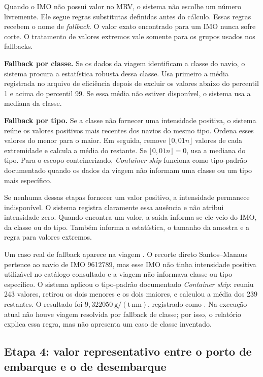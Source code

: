Quando o IMO não possui valor no MRV, o sistema não escolhe um número livremente. Ele segue regras substitutas definidas antes do cálculo. Essas regras recebem o nome de \emph{fallback}. O valor exato encontrado para um IMO nunca sofre corte. O tratamento de valores extremos vale somente para os grupos usados nos fallbacks.

\textbf{Fallback por classe.} Se os dados da viagem identificam a classe do navio, o sistema procura a estatística robusta dessa classe. Usa primeiro a média registrada no arquivo de eficiência depois de excluir os valores abaixo do percentil 1 e acima do percentil 99. Se essa média não estiver disponível, o sistema usa a mediana da classe.

\textbf{Fallback por tipo.} Se a classe não fornecer uma intensidade positiva, o sistema reúne os valores positivos mais recentes dos navios do mesmo tipo. Ordena esses valores do menor para o maior. Em seguida, remove \(\lfloor0{,}01n\rfloor\) valores de cada extremidade e calcula a média do restante. Se \(\lfloor0{,}01n\rfloor=0\), usa a mediana do tipo. Para o escopo conteinerizado, \emph{Container ship} funciona como tipo-padrão documentado quando os dados da viagem não informam uma classe ou um tipo mais específico.

Se nenhuma dessas etapas fornecer um valor positivo, a intensidade permanece indisponível. O sistema registra claramente essa ausência e não atribui intensidade zero. Quando encontra um valor, a saída informa se ele veio do IMO, da classe ou do tipo. Também informa a estatística, o tamanho da amostra e a regra para valores extremos.

Um caso real de fallback aparece na viagem . O recorte direto Santos--Manaus pertence ao navio de IMO 9612789, mas esse IMO não tinha intensidade positiva utilizável no catálogo consultado e a viagem não informava classe ou tipo específico. O sistema aplicou o tipo-padrão documentado \emph{Container ship}: reuniu 243 valores, retirou os dois menores e os dois maiores, e calculou a média dos 239 restantes. O resultado foi \(9{,}322050~\mathrm{g/(t\,nm)}\), registrado como . Na execução atual não houve viagem resolvida por fallback de classe; por isso, o relatório explica essa regra, mas não apresenta um caso de classe inventado.

\subsection*{Etapa 4: valor representativo entre o porto de embarque e o de desembarque}

